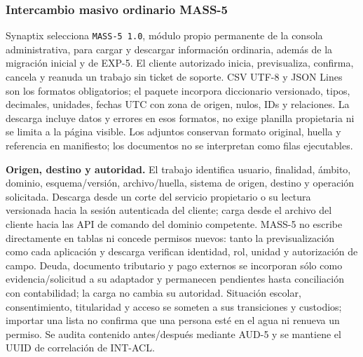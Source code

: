 \subsubsection{Intercambio masivo ordinario MASS-5}
\label{subsec:sd5_mass5}

Synaptix selecciona \texttt{MASS-5 1.0}, módulo propio permanente de la consola administrativa, para cargar y descargar información ordinaria, además de la migración inicial y de EXP-5. El cliente autorizado inicia, previsualiza, confirma, cancela y reanuda un trabajo sin ticket de soporte. CSV UTF-8 y JSON Lines son los formatos obligatorios; el paquete incorpora diccionario versionado, tipos, decimales, unidades, fechas UTC con zona de origen, nulos, IDs y relaciones. La descarga incluye datos y errores en esos formatos, no exige planilla propietaria ni se limita a la página visible. Los adjuntos conservan formato original, huella y referencia en manifiesto; los documentos no se interpretan como filas ejecutables.

\textbf{Origen, destino y autoridad.} El trabajo identifica usuario, finalidad, ámbito, dominio, esquema/versión, archivo/huella, sistema de origen, destino y operación solicitada. Descarga desde un corte del servicio propietario o su lectura versionada hacia la sesión autenticada del cliente; carga desde el archivo del cliente hacia las API de comando del dominio competente. MASS-5 no escribe directamente en tablas ni concede permisos nuevos: tanto la previsualización como cada aplicación y descarga verifican identidad, rol, unidad y autorización de campo. Deuda, documento tributario y pago externos se incorporan sólo como evidencia/solicitud a su adaptador y permanecen pendientes hasta conciliación con contabilidad; la carga no cambia su autoridad. Situación escolar, consentimiento, titularidad y acceso se someten a sus transiciones y custodios; importar una lista no confirma que una persona esté en el agua ni renueva un permiso. Se audita contenido antes/después mediante AUD-5 y se mantiene el UUID de correlación de INT-ACL.

